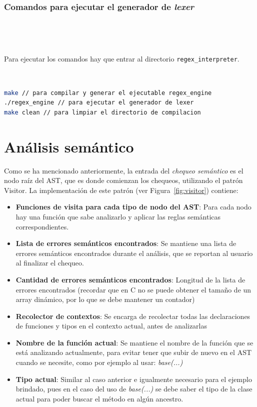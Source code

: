 \documentclass{llncs}
\begin{document}
\subsubsection{Comandos para ejecutar el generador de \textit{lexer}}

\  

\ 

Para ejecutar los comandos hay que entrar al directorio \texttt{regex\_interpreter}.
 
\

\begin{lstlisting}[language=bash]
make // para compilar y generar el ejecutable regex_engine
./regex_engine // para ejecutar el generador de lexer 
make clean // para limpiar el directorio de compilacion
\end{lstlisting}


\vspace{10pt}
\section{Análisis semántico}

Como se ha mencionado anteriormente, la entrada del \textit{chequeo semántico} es el nodo raíz del AST, que es donde comienzan los chequeos, utilizando el
patrón Visitor. La implementación de este patrón (ver Figura~\ref{fig:visitor}) contiene: 
\begin{itemize}
    \item \textbf{Funciones de visita para cada tipo de nodo del AST}: Para cada nodo hay una función que sabe analizarlo y aplicar las reglas semánticas correspondientes.
    \item \textbf{Lista de errores semánticos encontrados}: Se mantiene una lista de errores semánticos encontrados durante el análisis, que se reportan al usuario al finalizar el chequeo.
    \item \textbf{Cantidad de errores semánticos encontrados}: Longitud de la lista de errores encontrados (recordar que en C no se puede obtener el tamaño de un array dinámico, por lo que se debe mantener un contador)
    \item \textbf{Recolector de contextos}: Se encarga de recolectar todas las declaraciones de funciones y tipos en el contexto actual, antes de analizarlas
    \item \textbf{Nombre de la función actual}: Se mantiene el nombre de la función que se está analizando actualmente, para evitar tener que subir de nuevo en el AST cuando se necesite, como por ejemplo al usar: \textit{base(...)}
    \item \textbf{Tipo actual}: Similar al caso anterior e igualmente necesario para el ejemplo brindado, pues en el caso del uso de \textit{base(...)} se debe saber el tipo de la clase actual para poder buscar el método en algún ancestro.
\end{itemize}
\end{document}
